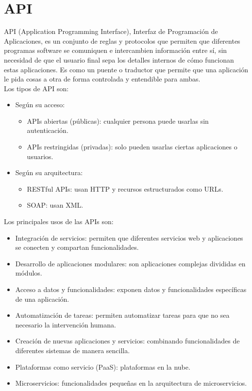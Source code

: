 \documentclass[10pt]{book}
\begin{document}
    \section{API}
    API (Application Programming Interface), Interfaz de Programación de Aplicaciones, es un conjunto de reglas y protocolos que permiten que diferentes programas software se comuniquen e intercambien información entre sí, sin necesidad de que el usuario final sepa los detalles internos de cómo funcionan estas aplicaciones. Es como un puente o traductor que permite que una aplicación le pida cosas a otra de forma controlada y entendible para ambas.\\
    Los tipos de API son:
        \begin{itemize}
            \item Según su acceso:
            \begin{itemize}
                \item APIs abiertas (públicas): cualquier persona puede usarlas sin autenticación.
                \item APIs restringidas (privadas): solo pueden usarlas ciertas aplicaciones o usuarios.
            \end{itemize}
            \item Según su arquitectura:
            \begin{itemize}
                \item RESTful APIs: usan HTTP y recursos estructurados como URLs.
                \item SOAP: usan XML.
            \end{itemize}
        \end{itemize}
    Los principales usos de las APIs son:
        \begin{itemize}
            \item Integración de servicios: permiten que diferentes servicios web y aplicaciones se conecten y compartan funcionalidades.
            \item Desarrollo de aplicaciones modulares: son aplicaciones complejas divididas en módulos.
            \item Acceso a datos y funcionalidades: exponen datos y funcionalidades específicas de una aplicación.
            \item Automatización de tareas: permiten automatizar tareas para que no sea necesario la intervención humana.
            \item Creación de nuevas aplicaciones y servicios: combinando funcionalidades de diferentes sistemas de manera sencilla.
            \item Plataformas como servicio (PaaS): plataformas en la nube.
            \item Microservicios: funcionalidades pequeñas en la arquitectura de microservicios.
        \end{itemize}
\end{document}
